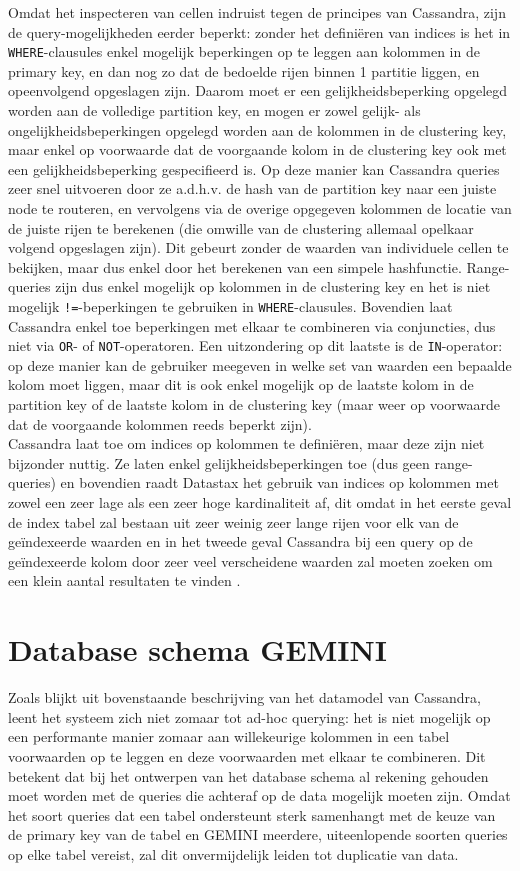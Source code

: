 Omdat het inspecteren van cellen indruist tegen de principes van Cassandra, zijn de query-mogelijkheden eerder beperkt: zonder het defini\"eren van indices is het in \texttt{WHERE}-clausules enkel mogelijk beperkingen op te leggen aan kolommen in de primary key, en dan nog zo dat de bedoelde rijen binnen 1 partitie liggen, en opeenvolgend opgeslagen zijn. Daarom moet er een gelijkheidsbeperking opgelegd worden aan de volledige partition key, en mogen er zowel gelijk- als ongelijkheidsbeperkingen opgelegd worden aan de kolommen in de clustering key, maar enkel op voorwaarde dat de voorgaande kolom in de clustering key ook met een gelijkheidsbeperking gespecifieerd is. Op deze manier kan Cassandra queries zeer snel uitvoeren door ze a.d.h.v. de hash van de partition key naar een juiste node te routeren, en vervolgens via de overige opgegeven kolommen de locatie van de juiste rijen te berekenen (die omwille van de clustering allemaal opelkaar volgend opgeslagen zijn). Dit gebeurt zonder de waarden van individuele cellen te bekijken, maar dus enkel door het berekenen van een simpele hashfunctie. Range-queries zijn dus enkel mogelijk op kolommen in de clustering key en het is niet mogelijk \texttt{!=}-beperkingen te gebruiken in \texttt{WHERE}-clausules. Bovendien laat Cassandra enkel toe beperkingen met elkaar te combineren via conjuncties, dus niet via \texttt{OR}- of \texttt{NOT}-operatoren. Een uitzondering op dit laatste is de \texttt{IN}-operator: op deze manier kan de gebruiker meegeven in welke set van waarden een bepaalde kolom moet liggen, maar dit is ook enkel mogelijk op de laatste kolom in de partition key of de laatste kolom in de clustering key (maar weer op voorwaarde dat de voorgaande kolommen reeds beperkt zijn).\\
Cassandra laat toe om indices op kolommen te defini\"eren, maar deze zijn niet bijzonder nuttig. Ze laten enkel gelijkheidsbeperkingen toe (dus geen range-queries) en bovendien raadt Datastax het gebruik van indices op kolommen met zowel een zeer lage als een zeer hoge kardinaliteit af, dit omdat in het eerste geval de index tabel zal bestaan uit zeer weinig zeer lange rijen voor elk van de ge\"indexeerde waarden en in het tweede geval Cassandra bij een query op de ge\"indexeerde kolom door zeer veel verscheidene waarden zal moeten zoeken om een klein aantal resultaten te vinden \cite{when_to_use_index}.

\section{Database schema GEMINI}
Zoals blijkt uit bovenstaande beschrijving van het datamodel van Cassandra, leent het systeem zich niet zomaar tot ad-hoc querying: het is niet mogelijk op een performante manier zomaar aan willekeurige kolommen in een tabel voorwaarden op te leggen en deze voorwaarden met elkaar te combineren. Dit betekent dat bij het ontwerpen van het database schema al rekening gehouden moet worden met de queries die achteraf op de data mogelijk moeten zijn. Omdat het soort queries dat een tabel ondersteunt sterk samenhangt met de keuze van de primary key van de tabel en GEMINI meerdere, uiteenlopende soorten queries op elke tabel vereist, zal dit onvermijdelijk leiden tot duplicatie van data.

